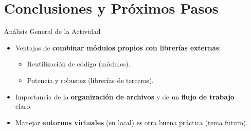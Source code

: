 \documentclass[10pt]{beamer}
\begin{document}
\begin{comment}
\begin{frame}{Ejemplo de Discusión}
  \begin{block}{Grupo 1}
    \begin{itemize}
      \item Usó \texttt{numpy} para multiplicar matrices.
      \item Implementó una función \texttt{inversa\_matriz(A)} que devuelve \(\mathbf{A}^{-1}\).
    \end{itemize}
  \end{block}
  \vspace{0.4cm}
  \begin{block}{Grupo 2}
    \begin{itemize}
      \item Usó \texttt{requests} para descargar una tabla de datos climáticos en \texttt{CSV}.
      \item Creó una función para calcular la temperatura promedio y la humedad relativa.
    \end{itemize}
  \end{block}
\end{frame}

\end{comment}
\section{Conclusiones y Próximos Pasos}

\begin{frame}{Análisis General de la Actividad}
  \begin{itemize}
    \item Ventajas de \textbf{combinar módulos propios con librerías externas}:
      \begin{itemize}
        \item Reutilización de código (módulos).
        \item Potencia y robustez (librerías de terceros).
      \end{itemize}
    \item Importancia de la \textbf{organización de archivos} y de un \textbf{flujo de trabajo} claro.
    \item Manejar \textbf{entornos virtuales} (en local) es otra buena práctica (tema futuro).
  \end{itemize}
\end{frame}
\end{document}
